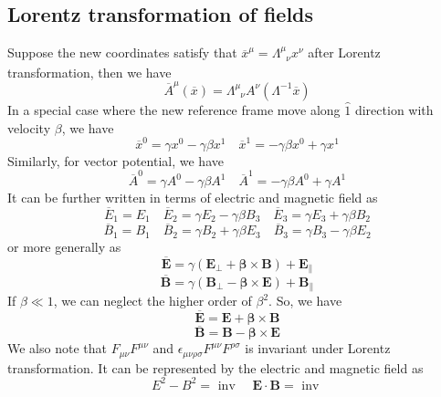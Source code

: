 \subsection{Lorentz transformation of fields}
Suppose the new coordinates satisfy that $\overline{x}^{\mu} = \Lambda^{\mu}_{\phantom{\mu}\nu}x^{\nu}$ after Lorentz transformation, then we have
\[\overline{A}^{\mu}(\overline{x}) = \Lambda^{\mu}_{\phantom{\mu}\nu}A^{\nu}(\Lambda^{-1}\overline{x})\]
In a special case where the new reference frame move along $\hat{1}$ direction with velocity $\beta$, we have
\[\overline{x}^{0} = \gamma x^0 - \gamma \beta x^1 \quad \overline{x}^{1} = -\gamma \beta x^0 + \gamma x^1\]
Similarly, for vector potential, we have 
\[\overline{A}^{0} = \gamma A^0 - \gamma \beta A^1 \quad \overline{A}^{1} = -\gamma \beta A^0 + \gamma A^1\]
It can be further written in terms of electric and magnetic field as
\[\overline{E}_1 = E_1 \quad \overline{E}_2 = \gamma E_2 - \gamma \beta B_3 \quad \overline{E}_3 = \gamma E_3 + \gamma \beta B_2\]
\[\overline{B}_1 = B_1 \quad \overline{B}_2 = \gamma B_2 + \gamma \beta E_3 \quad \overline{B}_3 = \gamma B_3 - \gamma \beta E_2\]
or more generally as
\[\bm{\overline{E}} = \gamma(\bm{E}_{\perp} + \bm{\beta} \times \bm{B}) + \bm{E}_{\parallel}\]
\[\bm{\overline{B}} = \gamma(\bm{B}_{\perp} - \bm{\beta} \times \bm{E}) + \bm{B}_{\parallel}\]
If $\beta \ll 1$, we can neglect the higher order of $\beta^2$. So, we have
\[\bm{\overline{E}} = \bm{E} + \bm{\beta} \times \bm{B}\]
\[\bm{\overline{B}} = \bm{B} - \bm{\beta} \times \bm{E}\]
We also note that $F_{\mu\nu}F^{\mu\nu}$ and $\epsilon_{\mu\nu\rho\sigma}F^{\mu\nu}F^{\rho\sigma}$ is invariant under Lorentz transformation. It can be represented by the electric and magnetic field as
\[E^2 - B^2 = \mbox{ inv } \quad \bm{E} \cdot \bm{B} = \mbox{ inv }\]

